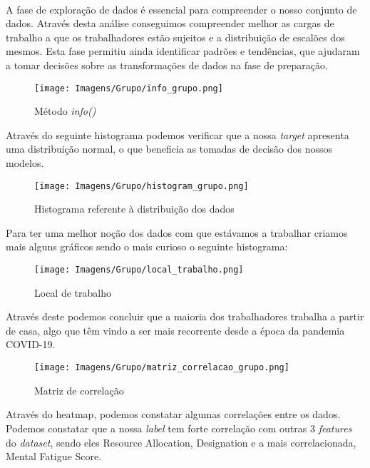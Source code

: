 \paragraph{}
A fase de exploração de dados é essencial para compreender o nosso conjunto de dados. Através desta análise conseguimos compreender melhor as cargas de trabalho a que os trabalhadores estão sujeitos e a distribuição de escalões dos mesmos.
Esta fase permitiu ainda identificar padrões e tendências, que ajudaram a tomar decisões sobre as transformações de dados na fase de preparação.

\begin{figure}[H]
    \centering
    \texttt{[image: Imagens/Grupo/info\_grupo.png]}
    \caption{Método \textit{info()}}
    \label{fig: info_grupo}
\end{figure}

Através do seguinte histograma podemos verificar que a nossa \textit{target} apresenta uma distribuição normal, o que beneficia as tomadas de decisão dos nossos modelos.

\begin{figure}[H]
    \centering
    \texttt{[image: Imagens/Grupo/histogram\_grupo.png]}
    \caption{Histograma referente à distribuição dos dados}
    \label{fig: histogram_grupo}
\end{figure}

Para ter uma melhor noção dos dados com que estávamos a trabalhar criamos mais alguns gráficos sendo o mais curioso o seguinte histograma:

\begin{figure}[H]
    \centering
    \texttt{[image: Imagens/Grupo/local\_trabalho.png]}
    \caption{Local de trabalho}
    \label{fig: local_trabalho}
\end{figure}

Através deste podemos concluir que a maioria dos trabalhadores trabalha a partir de casa, algo que têm vindo a ser mais recorrente desde a época da pandemia COVID-19.

\begin{figure}[H]
    \centering
    \centerline{\texttt{[image: Imagens/Grupo/matriz\_correlacao\_grupo.png]}}
    \caption{Matriz de correlação}
    \label{fig: matriz_correlacao_grupo}
\end{figure}

Através do heatmap, podemos constatar algumas correlações entre os dados. Podemos constatar que a nossa \textit{label} tem forte correlação com outras 3 \textit{features} do \textit{dataset}, sendo eles Resource Allocation, Designation e a mais correlacionada, Mental Fatigue Score.

